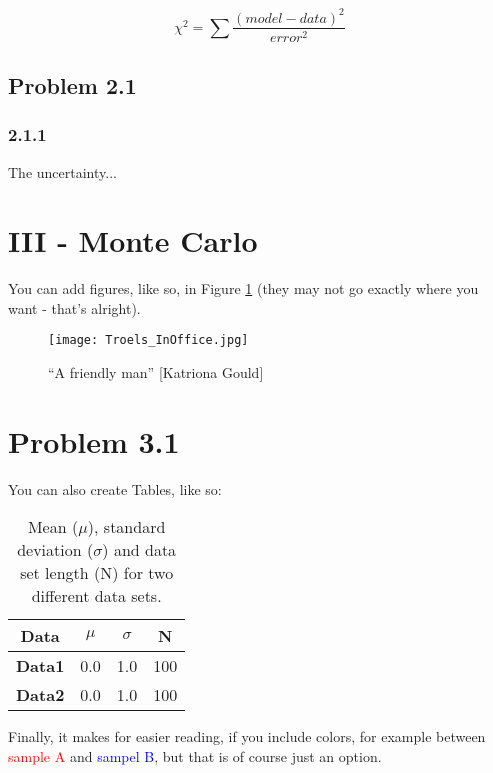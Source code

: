 \documentclass{article}
\begin{document}
\begin{equation}
    \chi ^{2} = \sum \frac{(model-data)^{2}}{error^{2}}
    \label{eq1}
\end{equation}

\subsection*{Problem 2.1}
\subsubsection*{2.1.1} The uncertainty...



\section*{III - Monte Carlo}
You can add figures, like so, in Figure \ref{fig1} (they may not go exactly where you want - that's alright). 

\begin{figure}[h]
    \centering
    \texttt{[image: Troels\_InOffice.jpg]}
    \caption{``A friendly man'' [Katriona Gould]}
    \label{fig1}
\end{figure}

\section*{Problem 3.1}
You can also create Tables, like so: 

\begin{table}[hbtp!]
\begin{centering}
\begin{tabular}{ |c|c|c|c| } 
  \hline
  Data & $\mu$ & $\sigma$ & N\\ 
  \hline 
  \textbf{Data1} & 0.0 & 1.0 & 100 \\ 
  \textbf{Data2} & 0.0 & 1.0 & 100 \\ 
  \hline
\end{tabular}
\caption{Mean ($\mu$), standard deviation ($\sigma$) and data set length (N) for two different data sets.}
\label{tab:cleaned}
\end{centering}
\end{table}

Finally, it makes for easier reading, if you include colors, for example between \textcolor{red}{sample A} and \textcolor{blue}{sampel B}, but that is of course just an option.
\end{document}
